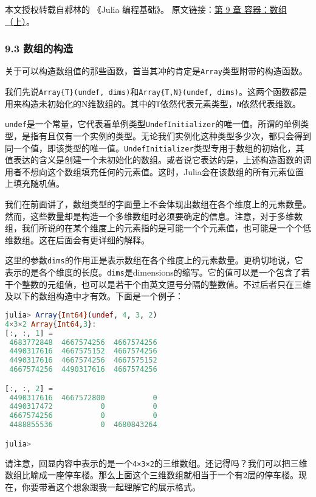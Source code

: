 
本文授权转载自郝林的 《Julia 编程基础》。 原文链接：\href{https://github.com/hyper0x/JuliaBasics/blob/master/book/ch09.md}{第 9 章 容器：数组（上）}。


\subsubsection{9.3 数组的构造}

关于可以构造数组值的那些函数，首当其冲的肯定是\verb`Array`类型附带的构造函数。

我们先说\verb`Array{T}(undef, dims)`和\verb`Array{T,N}(undef, dims)`。这两个函数都是用来构造未初始化的N维数组的。其中的\verb`T`依然代表元素类型，\verb`N`依然代表维数。

\verb`undef`是一个常量，它代表着单例类型\verb`UndefInitializer`的唯一值。所谓的单例类型，是指有且仅有一个实例的类型。无论我们实例化这种类型多少次，都只会得到同一个值，即该类型的唯一值。\verb`UndefInitializer`类型专用于数组的初始化，其值表达的含义是创建一个未初始化的数组。或者说它表达的是，上述构造函数的调用者不想向这个数组填充任何的元素值。这时，Julia会在该数组的所有元素位置上填充随机值。

我们在前面讲了，数组类型的字面量上不会体现出数组在各个维度上的元素数量。然而，这些数量却是构造一个多维数组时必须要确定的信息。注意，对于多维数组，我们所说的在某个维度上的元素指的是可能一个个元素值，也可能是一个个低维数组。这在后面会有更详细的解释。

这里的参数\verb`dims`的作用正是表示数组在各个维度上的元素数量。更确切地说，它表示的是各个维度的长度。\verb`dims`是dimensions的缩写。它的值可以是一个包含了若干个整数的元组值，也可以是若干个由英文逗号分隔的整数值。不过后者只在三维及以下的数组构造中才有效。下面是一个例子：

\begin{lstlisting}[language=julia]
julia> Array{Int64}(undef, 4, 3, 2)
4×3×2 Array{Int64,3}:
[:, :, 1] =
 4683772848  4667574256  4667574256
 4490317616  4667575152  4667574256
 4490317616  4667574256  4667575152
 4667574256  4490317616  4667574256

[:, :, 2] =
 4490317616  4667572800           0
 4490317472           0           0
 4667574256           0           0
 4488855536           0  4680843264

julia> 
\end{lstlisting}

请注意，回显内容中表示的是一个\verb`4×3×2`的三维数组。还记得吗？我们可以把三维数组比喻成一座停车楼。那么上面这个三维数组就相当于一个有2层的停车楼。现在，你要带着这个想象跟我一起理解它的展示格式。

